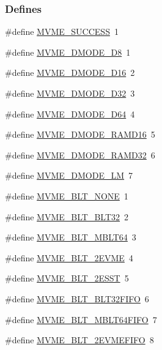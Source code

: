 \subsubsection*{Defines}
\begin{DoxyCompactItemize}
\item 
\#define \hyperlink{group__mvmestdinclude_ga1671785ba0bbf639935547e7b1d3f641}{MVME\_\-SUCCESS}~1
\item 
\#define \hyperlink{group__mvmestdinclude_ga7e9bd9d8731cf357b74b477d86e3871e}{MVME\_\-DMODE\_\-D8}~1
\item 
\#define \hyperlink{group__mvmestdinclude_ga36525e38132744a48e26d7ee2b158d2c}{MVME\_\-DMODE\_\-D16}~2
\item 
\#define \hyperlink{group__mvmestdinclude_ga1106eeff8cdbd2cfb5516f7feea8c1ff}{MVME\_\-DMODE\_\-D32}~3
\item 
\#define \hyperlink{group__mvmestdinclude_ga072f6459693256bff0c351153baf6dc5}{MVME\_\-DMODE\_\-D64}~4
\item 
\#define \hyperlink{group__mvmestdinclude_gad828794144a2e8bc886603ec200ae285}{MVME\_\-DMODE\_\-RAMD16}~5
\item 
\#define \hyperlink{group__mvmestdinclude_gaf33ae8d3aca31ae4679f0a12647071b8}{MVME\_\-DMODE\_\-RAMD32}~6
\item 
\#define \hyperlink{group__mvmestdinclude_ga9da3a119be8e2aaf29f8858495e6b2b8}{MVME\_\-DMODE\_\-LM}~7
\item 
\#define \hyperlink{group__mvmestdinclude_ga820b9a818f3f5b5741c6bd20ebf0cead}{MVME\_\-BLT\_\-NONE}~1
\item 
\#define \hyperlink{group__mvmestdinclude_ga27ecf7af5c7788bc6e59ad1084112759}{MVME\_\-BLT\_\-BLT32}~2
\item 
\#define \hyperlink{group__mvmestdinclude_ga29f0f94e8421c77f5bd0da963fbab2ab}{MVME\_\-BLT\_\-MBLT64}~3
\item 
\#define \hyperlink{group__mvmestdinclude_gac50f921d73b6b2e78540d734bed2cf05}{MVME\_\-BLT\_\-2EVME}~4
\item 
\#define \hyperlink{group__mvmestdinclude_gab2a0692732d5c4514218c4eeb9257567}{MVME\_\-BLT\_\-2ESST}~5
\item 
\#define \hyperlink{group__mvmestdinclude_ga8555fba49268cce0bc9daf90c3c052ff}{MVME\_\-BLT\_\-BLT32FIFO}~6
\item 
\#define \hyperlink{group__mvmestdinclude_gaab423ba16ad8c2f328862e7090cea712}{MVME\_\-BLT\_\-MBLT64FIFO}~7
\item 
\#define \hyperlink{group__mvmestdinclude_ga2b64419d5ad7dc206d4b4005368e6651}{MVME\_\-BLT\_\-2EVMEFIFO}~8

\end{DoxyCompactItemize}

